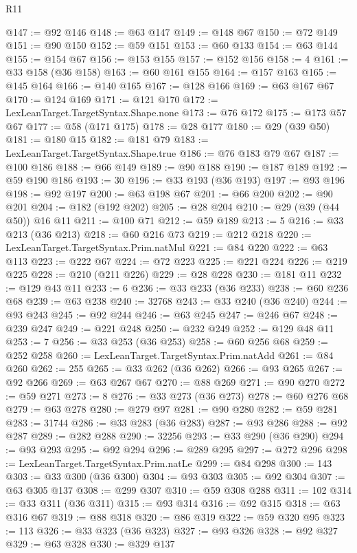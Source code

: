 \begin{lexlean}{R11}
\begin{coremodule}
@147 := @92 @146
@148 := @63 @147
@149 := @148 @67
@150 := @72 @149
@151 := @90 @150
@152 := @59 @151
@153 := @60 @133
@154 := @63 @144
@155 := @154 @67
@156 := @153 @155
@157 := @152 @156
@158 := 4
@161 := @33 @158 (@36 @158)
@163 := @60 @161 @155
@164 := @157 @163
@165 := @145 @164
@166 := @140 @165
@167 := @128 @166
@169 := @63 @167 @67
@170 := @124 @169
@171 := @121 @170
@172 := LexLeanTarget.TargetSyntax.Shape.none
@173 := @76 @172
@175 := @173 @57 @67
@177 := @58 (@171 @175)
@178 := @28 @177
@180 := @29 (@39 @50)
@181 := @180 @15
@182 := @181 @79
@183 := LexLeanTarget.TargetSyntax.Shape.true
@186 := @76 @183 @79 @67
@187 := @100 @186
@188 := @66 @149
@189 := @90 @188
@190 := @187 @189
@192 := @59 @190 @186
@193 := 30
@196 := @33 @193 (@36 @193)
@197 := @93 @196
@198 := @92 @197
@200 := @63 @198 @67
@201 := @66 @200
@202 := @90 @201
@204 := @182 (@192 @202)
@205 := @28 @204
@210 := @29 (@39 (@44 @50)) @16 @11
@211 := @100 @71
@212 := @59 @189
@213 := 5
@216 := @33 @213 (@36 @213)
@218 := @60 @216 @73
@219 := @212 @218
@220 := LexLeanTarget.TargetSyntax.Prim.natMul
@221 := @84 @220
@222 := @63 @113
@223 := @222 @67
@224 := @72 @223
@225 := @221 @224
@226 := @219 @225
@228 := @210 (@211 @226)
@229 := @28 @228
@230 := @181 @11
@232 := @129 @43 @11
@233 := 6
@236 := @33 @233 (@36 @233)
@238 := @60 @236 @68
@239 := @63 @238
@240 := 32768
@243 := @33 @240 (@36 @240)
@244 := @93 @243
@245 := @92 @244
@246 := @63 @245
@247 := @246 @67
@248 := @239 @247
@249 := @221 @248
@250 := @232 @249
@252 := @129 @48 @11
@253 := 7
@256 := @33 @253 (@36 @253)
@258 := @60 @256 @68
@259 := @252 @258
@260 := LexLeanTarget.TargetSyntax.Prim.natAdd
@261 := @84 @260
@262 := 255
@265 := @33 @262 (@36 @262)
@266 := @93 @265
@267 := @92 @266
@269 := @63 @267 @67
@270 := @88 @269
@271 := @90 @270
@272 := @59 @271
@273 := 8
@276 := @33 @273 (@36 @273)
@278 := @60 @276 @68
@279 := @63 @278
@280 := @279 @97
@281 := @90 @280
@282 := @59 @281
@283 := 31744
@286 := @33 @283 (@36 @283)
@287 := @93 @286
@288 := @92 @287
@289 := @282 @288
@290 := 32256
@293 := @33 @290 (@36 @290)
@294 := @93 @293
@295 := @92 @294
@296 := @289 @295
@297 := @272 @296
@298 := LexLeanTarget.TargetSyntax.Prim.natLe
@299 := @84 @298
@300 := 143
@303 := @33 @300 (@36 @300)
@304 := @93 @303
@305 := @92 @304
@307 := @63 @305 @137
@308 := @299 @307
@310 := @59 @308 @288
@311 := 102
@314 := @33 @311 (@36 @311)
@315 := @93 @314
@316 := @92 @315
@318 := @63 @316 @67
@319 := @88 @318
@320 := @86 @319
@322 := @59 @320 @95
@323 := 113
@326 := @33 @323 (@36 @323)
@327 := @93 @326
@328 := @92 @327
@329 := @63 @328
@330 := @329 @137

\end{coremodule}
\end{lexlean}
